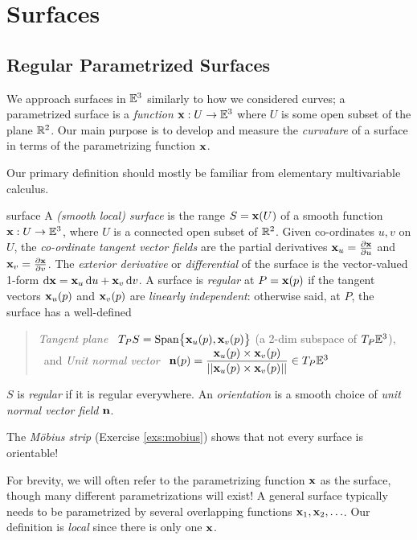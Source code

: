 \graphicspath{{surfaces/asy/}}

\section{Surfaces}\label{chap:surfaces}

\subsection{Regular Parametrized Surfaces}\label{sec:regularsurfaces}

We approach surfaces in $\E^3$ similarly to how we considered curves; a parametrized surface is a \emph{function} $\vx:U\to\E^3$ where $U$ is some open subset of the plane $\R^2$. Our main purpose is to develop and measure the \emph{curvature} of a surface in terms of the parametrizing function $\vx$.\medbreak


Our primary definition should mostly be familiar from elementary multivariable calculus.

\begin{defn}{}{surface}
	A \emph{(smooth local) surface} is the range $S=\vx(U)$ of a smooth function $\vx:U\to\E^3$, where $U$ is a connected open subset of $\R^2$.\smallbreak
	Given co-ordinates $u,v$ on $U$, the \emph{co-ordinate tangent vector fields} are the partial derivatives $\vx_u=\partials[\vx]{u}$ and $\vx_v=\partials[\vx]{v}$.\smallbreak
	The \emph{exterior derivative} or \emph{differential} of the surface is the vector-valued 1-form $\dvx=\vx_u\,\du+\vx_v\,\dv$.\smallbreak
	A surface is \emph{regular} at $P=\vx(p)$ if the tangent vectors $\vx_u(p)$ and $\vx_v(p)$ are \emph{linearly independent}: otherwise said, at $P$, the surface has a well-defined
	\begin{quote}
		\emph{Tangent plane} \ $T_PS=\Span\bigl\{\vx_u(p),\vx_v(p)\bigr\}$ (a 2-dim subspace of $T_P\E^3$), \ and \smallbreak
		\emph{Unit normal vector} \ $\vn(p)=\dfrac{\vx_u(p)\times\vx_v(p)}{\Nm{\vx_u(p)\times\vx_v(p)}} \in T_P\E^3$
	\end{quote} 
	$S$ is \emph{regular} if it is regular everywhere. An \emph{orientation} is a smooth choice of \emph{unit normal vector field} $\vn$.
\end{defn}

The \emph{Möbius strip} (Exercise \ref{exs:mobius}) shows that not every surface is orientable!\par
For brevity, we will often refer to the parametrizing function $\vx$ as the surface, though many different parametrizations will exist! A general surface typically needs to be parametrized by several overlapping functions $\vx_1,\vx_2,\ldots$. Our definition is \emph{local} since there is only one $\vx$.


